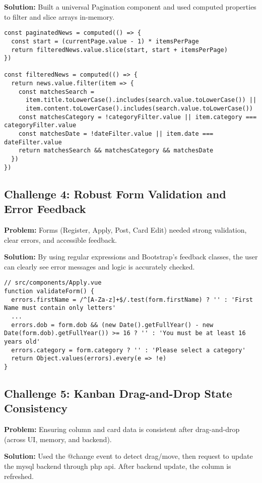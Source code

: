 \documentclass[11pt,a4paper]{article}
\begin{document}
\textbf{Solution:} Built a universal Pagination component and used computed properties to filter and slice arrays in-memory.

\begin{verbatim}
const paginatedNews = computed(() => {
  const start = (currentPage.value - 1) * itemsPerPage
  return filteredNews.value.slice(start, start + itemsPerPage)
})

const filteredNews = computed(() => {
  return news.value.filter(item => {
    const matchesSearch = 
      item.title.toLowerCase().includes(search.value.toLowerCase()) ||
      item.content.toLowerCase().includes(search.value.toLowerCase())
    const matchesCategory = !categoryFilter.value || item.category === categoryFilter.value
    const matchesDate = !dateFilter.value || item.date === dateFilter.value
    return matchesSearch && matchesCategory && matchesDate
  })
})
\end{verbatim}

\subsection*{Challenge 4: Robust Form Validation and Error Feedback}
\textbf{Problem:} Forms (Register, Apply, Post, Card Edit) needed strong validation, clear errors, and accessible feedback.

\textbf{Solution:} By using regular expressions and Bootstrap's feedback classes, the user can clearly see error messages and logic is accurately checked.

\begin{verbatim}
// src/components/Apply.vue
function validateForm() {
  errors.firstName = /^[A-Za-z]+$/.test(form.firstName) ? '' : 'First Name must contain only letters'
  ...
  errors.dob = form.dob && (new Date().getFullYear() - new Date(form.dob).getFullYear()) >= 16 ? '' : 'You must be at least 16 years old'
  errors.category = form.category ? '' : 'Please select a category'
  return Object.values(errors).every(e => !e)
}
\end{verbatim}

\subsection*{Challenge 5: Kanban Drag-and-Drop State Consistency}
\textbf{Problem:} Ensuring column and card data is consistent after drag-and-drop (across UI, memory, and backend).

\textbf{Solution:} Used the @change event to detect drag/move, then request to update the mysql backend through php api. After backend update, the column is refreshed.
\end{document}
